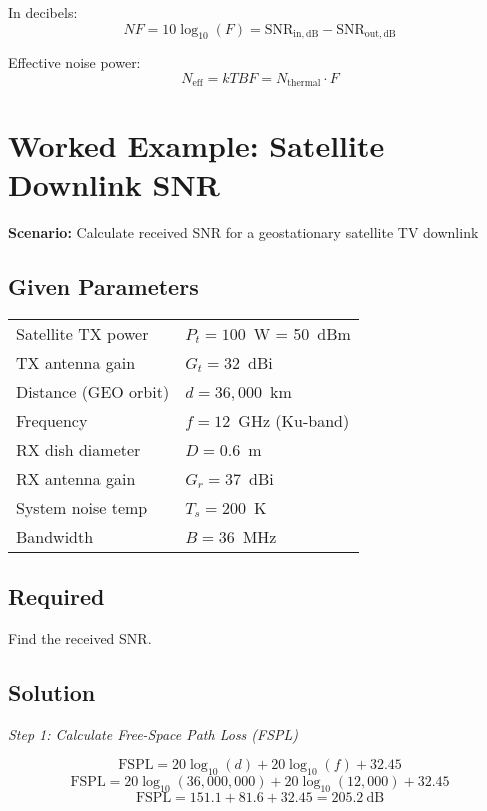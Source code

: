 In decibels:
\begin{equation}
NF = 10\log_{10}(F) = \mathrm{SNR_{in,dB}} - \mathrm{SNR_{out,dB}}
\end{equation}

Effective noise power:
\begin{equation}
N_{\mathrm{eff}} = kTBF = N_{\mathrm{thermal}} \cdot F
\end{equation}

\section{Worked Example: Satellite Downlink SNR}

\textbf{Scenario:} Calculate received SNR for a geostationary satellite TV downlink

\subsection*{Given Parameters}

\begin{tabular}{@{}ll@{}}
Satellite TX power & $P_t = 100$~W = 50~dBm \\
TX antenna gain & $G_t = 32$~dBi \\
Distance (GEO orbit) & $d = 36{,}000$~km \\
Frequency & $f = 12$~GHz (Ku-band) \\
RX dish diameter & $D = 0.6$~m \\
RX antenna gain & $G_r = 37$~dBi \\
System noise temp & $T_s = 200$~K \\
Bandwidth & $B = 36$~MHz \\
\end{tabular}

\subsection*{Required}

Find the received SNR.

\subsection*{Solution}

\textit{Step 1: Calculate Free-Space Path Loss (FSPL)}

\begin{equation}
\mathrm{FSPL} = 20\log_{10}(d) + 20\log_{10}(f) + 32.45
\end{equation}
\begin{equation}
\mathrm{FSPL} = 20\log_{10}(36{,}000{,}000) + 20\log_{10}(12{,}000) + 32.45
\end{equation}
\begin{equation}
\mathrm{FSPL} = 151.1 + 81.6 + 32.45 = 205.2~\text{dB}
\end{equation}

